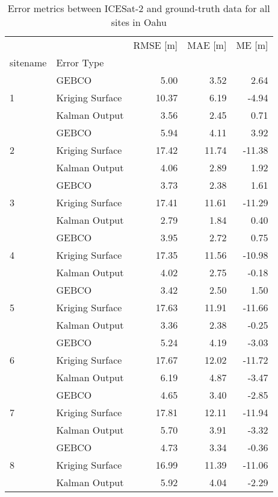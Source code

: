 \begin{table}[!ht]
\centering
\caption{Error metrics between ICESat-2 and ground-truth data for all sites in Oahu}
\label{tab:appendix_oahu_raster_error}
\begin{tabular}{llrrr}
\toprule
 &  & RMSE [m] & MAE [m] & ME [m] \\
sitename & Error Type &  &  &  \\
\midrule
\multirow[c]{3}{*}{1} & GEBCO & 5.00 & 3.52 & 2.64 \\
 & Kriging Surface & 10.37 & 6.19 & -4.94 \\
 & Kalman Output & 3.56 & 2.45 & 0.71 \\
\cline{1-2}
\multirow[c]{3}{*}{2} & GEBCO & 5.94 & 4.11 & 3.92 \\
 & Kriging Surface & 17.42 & 11.74 & -11.38 \\
 & Kalman Output & 4.06 & 2.89 & 1.92 \\
\cline{1-2}
\multirow[c]{3}{*}{3} & GEBCO & 3.73 & 2.38 & 1.61 \\
 & Kriging Surface & 17.41 & 11.61 & -11.29 \\
 & Kalman Output & 2.79 & 1.84 & 0.40 \\
\cline{1-2}
\multirow[c]{3}{*}{4} & GEBCO & 3.95 & 2.72 & 0.75 \\
 & Kriging Surface & 17.35 & 11.56 & -10.98 \\
 & Kalman Output & 4.02 & 2.75 & -0.18 \\
\cline{1-2}
\multirow[c]{3}{*}{5} & GEBCO & 3.42 & 2.50 & 1.50 \\
 & Kriging Surface & 17.63 & 11.91 & -11.66 \\
 & Kalman Output & 3.36 & 2.38 & -0.25 \\
\cline{1-2}
\multirow[c]{3}{*}{6} & GEBCO & 5.24 & 4.19 & -3.03 \\
 & Kriging Surface & 17.67 & 12.02 & -11.72 \\
 & Kalman Output & 6.19 & 4.87 & -3.47 \\
\cline{1-2}
\multirow[c]{3}{*}{7} & GEBCO & 4.65 & 3.40 & -2.85 \\
 & Kriging Surface & 17.81 & 12.11 & -11.94 \\
 & Kalman Output & 5.70 & 3.91 & -3.32 \\
\cline{1-2}
\multirow[c]{3}{*}{8} & GEBCO & 4.73 & 3.34 & -0.36 \\
 & Kriging Surface & 16.99 & 11.39 & -11.06 \\
 & Kalman Output & 5.92 & 4.04 & -2.29 \\
\cline{1-2}
\bottomrule
\end{tabular}
\end{table}
